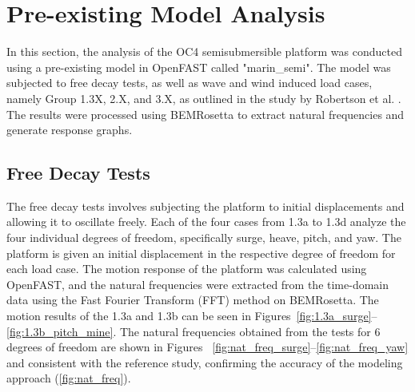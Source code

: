 \documentclass[a4paper, 11pt]{article}
\begin{document}
\section{Pre-existing Model Analysis}

\hspace*{0.5cm}In this section, the analysis of the OC4 semisubmersible platform was conducted using a pre-existing model in OpenFAST called "marin\_semi". The model was subjected to free decay tests, as well as  wave and wind induced load cases, namely Group 1.3X, 2.X, and 3.X, as outlined in the study by Robertson et al. \cite{Robertson2014}. The results were processed using BEMRosetta to extract natural frequencies and generate response graphs.

\subsection{Free Decay Tests}
\hspace*{0.5cm}The free decay tests involves subjecting the platform to initial displacements and allowing it to oscillate freely. Each of the four cases from 1.3a to 1.3d analyze the four individual degrees of freedom, specifically surge, heave, pitch, and yaw. The platform is given an initial displacement in the respective degree of freedom for each load case. The motion response of the platform was calculated using OpenFAST, and the natural frequencies were extracted from the time-domain data using the Fast Fourier Transform (FFT) method on BEMRosetta. The motion results of the 1.3a and 1.3b can be seen in Figures~\ref{fig:1.3a_surge}--\ref{fig:1.3b_pitch_mine}. The natural frequencies obtained from the tests for 6 degrees of freedom are shown in Figures ~\ref{fig:nat_freq_surge}--\ref{fig:nat_freq_yaw} and consistent with the reference study, confirming the accuracy of the modeling approach (\autoref{fig:nat_freq}).
\vspace{0.3cm}
\end{document}
